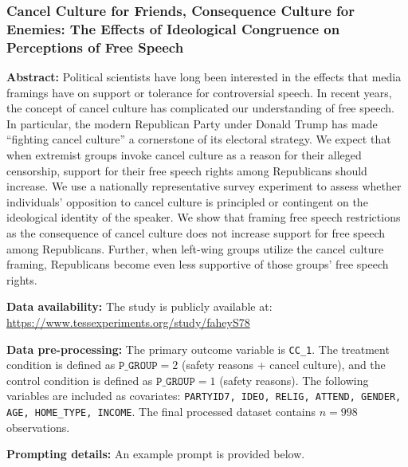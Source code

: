 \subsubsection{Cancel Culture for Friends, Consequence Culture for Enemies: The Effects of Ideological Congruence on Perceptions of Free Speech~\citep{fahey2023principled}}

\textbf{Abstract:} Political scientists have long been interested in the effects that media framings have on support or tolerance for controversial speech. In recent years, the concept of cancel culture has complicated our understanding of free speech. In particular, the modern Republican Party under Donald Trump has made ``fighting cancel culture'' a cornerstone of its electoral strategy. We expect that when extremist groups invoke cancel culture as a reason for their alleged censorship, support for their free speech rights among Republicans should increase. We use a nationally representative survey experiment to assess whether individuals’ opposition to cancel culture is principled or contingent on the ideological identity of the speaker. We show that framing free speech restrictions as the consequence of cancel culture does not increase support for free speech among Republicans. Further, when left-wing groups utilize the cancel culture framing, Republicans become even less supportive of those groups’ free speech rights.


\textbf{Data availability:}  The study is publicly available at: \url{https://www.tessexperiments.org/study/faheyS78}


\textbf{Data pre-processing:} The primary outcome variable is \texttt{CC\_1}. The treatment condition is defined as $\texttt{P\_GROUP} =2$ (safety reasons + cancel culture), and the control condition is defined as $\texttt{P\_GROUP} =1$ (safety reasons). The following variables are included as covariates: \texttt{PARTYID7, IDEO, RELIG, ATTEND, GENDER, AGE, HOME\_TYPE, INCOME}. The final processed dataset contains $n=998$ observations.

\textbf{Prompting details:} 
An example prompt is provided below.


